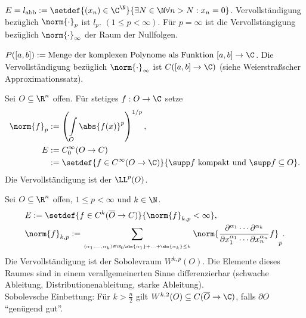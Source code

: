 \begin{bsp}
\label{bsp:1.18}
\begin{bspenum}
  \item $E=l_\text{abb}:=\setdef{(x_n)\in \C^\N}{\exists N\in\N \forall n> N :
  x_n =0}$. Vervollständigung bezüglich $\norm{\cdot}_p$ ist $l_p$. $(1\le p <
  \infty)$. Für $p=\infty$ ist die Vervollstängigung bezüglich
  $\norm{\cdot}_\infty$ der Raum der Nullfolgen.
  \item $P([a,b]):=\text{Menge der komplexen Polynome als Funktion
  }[a,b]\to\C$. Die Vervollständigung bezüglich $\norm{\cdot}_\infty$ ist
  $C([a,b]\to\C)$ (siehe Weierstraßscher Approximationssatz).
  \item Sei $O\subseteq\R^n$ offen. Für stetiges $f:O\to\C$ setze
\begin{align*}
\norm{f}_p &:= \left(\int\limits_O \abs{f(x)}^p \right)^{1/p},\\
E&:=C_0^\infty(O\to C) \\ &:= \setdef{f\in C^\infty(O\to\C)}{\supp f
\text{ kompakt und }\supp f \subseteq O}.
\end{align*}
Die Vervollständigung ist der $\LL^p(O)$.
\item Sei $O\subseteq \R^n$ offen, $1\le p <\infty$ und $k\in\N$.
\begin{align*}
&E:= \setdef{f\in C^k(\overline{O}\to C)}{\norm{f}_{k,p}< \infty},\\
&\norm{f}_{k,p} := \sum\limits_{\atop{(\alpha_1,\ldots,\alpha_k)\in
\N_0}{\abs{\alpha_1}+\ldots+\abs{\alpha_k}\le k}}
\norm{\frac{\partial^{\alpha_1}\cdots \partial^{\alpha_k}}{\partial
x_1^{\alpha_1}\cdots \partial x_n^{\alpha_n}} f}_p. 
\end{align*}
Die Vervollständigung ist der Sobolevraum $W^{k,p}(O)$. Die Elemente dieses
Raumes sind in einem verallgemeinerten Sinne differenzierbar (schwache
Ableitung, Distributionenableitung, starke Ableitung).\\
Sobolevsche Einbettung:
Für $k>\frac{n}{2}$ gilt $W^{k,2}(O)\subseteq C(\overline{O}\to\C)$, falls
$\partial O$ ``genügend gut''.\bsphere
\end{bspenum}
\end{bsp}

